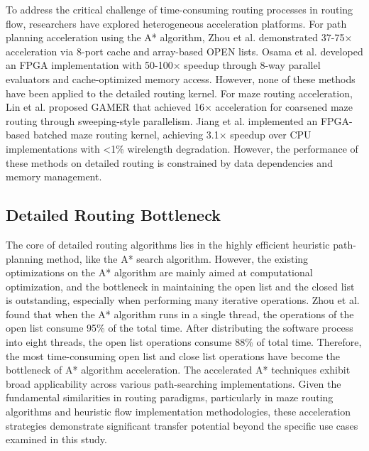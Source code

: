 To address the critical challenge of time-consuming routing processes in routing flow, researchers have explored heterogeneous acceleration platforms. 
For path planning acceleration using the A* algorithm, Zhou et al.\cite{FP2020} demonstrated 37-75× acceleration via 8-port cache and array-based OPEN lists. 
Osama et al.\cite{Fa2021} developed an FPGA implementation with 50-100× speedup through 8-way parallel evaluators and cache-optimized memory access. 
However, none of these methods have been applied to the detailed routing kernel.
For maze routing acceleration, Lin et al.\cite{GA2023} proposed GAMER 
that achieved 16× acceleration for coarsened maze routing through sweeping-style parallelism. 
Jiang et al.\cite{FP2022} implemented an FPGA-based batched maze routing kernel, achieving 3.1× speedup over CPU implementations with <1\% wirelength degradation. 
However, the performance of these methods on detailed routing is constrained by data dependencies and memory management.

\subsection{Detailed Routing Bottleneck}

The core of detailed routing algorithms lies in the highly efficient heuristic path-planning method, like the A* search algorithm. 
However, the existing optimizations on the A* algorithm are mainly aimed at computational optimization, 
and the bottleneck in maintaining the open list and the closed list is outstanding, especially when performing many iterative operations. 
Zhou et al.\cite{FP2020} found that when the A* algorithm runs in a single thread, the operations of the open list consume 95\% of the total time. 
After distributing the software process into eight threads, the open list operations consume 88\% of total time. 
Therefore, the most time-consuming open list and close list operations have become the bottleneck of A* algorithm acceleration. 
The accelerated A* techniques exhibit broad applicability across various path-searching implementations. 
Given the fundamental similarities in routing paradigms, particularly in maze routing algorithms and heuristic flow implementation methodologies, 
these acceleration strategies demonstrate significant transfer potential beyond the specific use cases examined in this study. 

